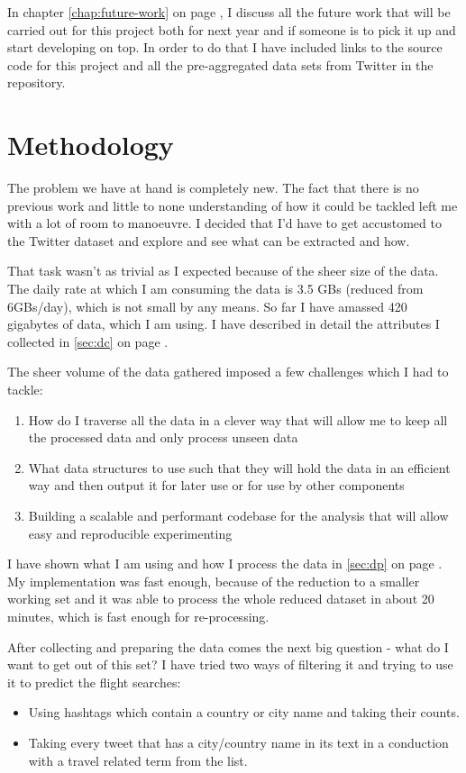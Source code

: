 \documentclass[minf,frontabs,twoside,singlespacing,parskip]{infthesis}
\begin{document}
In chapter \ref{chap:future-work} on page \pageref{chap:future-work}, I discuss all the future work that will be carried out for this project both for next year and if someone is to pick it up and start developing on top. In order to do that I have included links to the source code for this project and all the pre-aggregated data sets from Twitter in the repository.


\chapter{Methodology}
\label{chap:method}

The problem we have at hand is completely new. The fact that there is no previous work and little to none understanding of how it could be tackled left me with a lot of room to manoeuvre. I decided that I'd have to get accustomed to the Twitter dataset and explore and see what can be extracted and how. 


That task wasn't as trivial as I expected because of the sheer size of the data. The daily rate at which I am consuming the data is 3.5 GBs (reduced from 6GBs/day), which is not small by any means. So far I have amassed 420 gigabytes of data, which I am using. I have described in detail the attributes I collected in \ref{sec:dc} on page \pageref{sec:dc}. 


The sheer volume of the data gathered imposed a few challenges which I had to tackle:
\begin{enumerate}
\item How do I traverse all the data in a clever way that will allow me to keep all the processed data and only process unseen data
\item What data structures to use such that they will hold the data in an efficient way and then output it for later use or for use by other components
\item Building a scalable and performant codebase for the analysis that will allow easy and reproducible experimenting
\end{enumerate}

I have shown what I am using and how I process the data in \ref{sec:dp} on page \pageref{sec:dp}. My implementation was fast enough, because of the reduction to a smaller working set and it was able to process the whole reduced dataset in about 20 minutes, which is fast enough for re-processing.

After collecting and preparing the data comes the next big question - what do I want to get out of this set? I have tried two ways of filtering it and trying to use it to predict the flight searches:
\begin{itemize}
\item Using hashtags which contain a country or city name and taking their counts.
\item Taking every tweet that has a city/country name in its text in a conduction with a travel related term from the list. 
\end{itemize}
\end{document}
